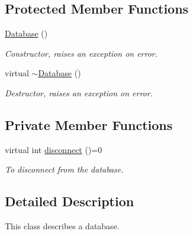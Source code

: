 \subsection*{Protected Member Functions}
\begin{DoxyCompactItemize}
\item 
\hypertarget{classDatabase_a4703c80e6969d33565ea340f768fdadf}{
\hyperlink{classDatabase_a4703c80e6969d33565ea340f768fdadf}{Database} ()}
\label{classDatabase_a4703c80e6969d33565ea340f768fdadf}

\begin{DoxyCompactList}\small\item\em Constructor, raises an exception on error. \item\end{DoxyCompactList}\item 
\hypertarget{classDatabase_a84d399a2ad58d69daab9b05330e1316d}{
virtual \hyperlink{classDatabase_a84d399a2ad58d69daab9b05330e1316d}{$\sim$Database} ()}
\label{classDatabase_a84d399a2ad58d69daab9b05330e1316d}

\begin{DoxyCompactList}\small\item\em Destructor, raises an exception on error. \item\end{DoxyCompactList}\end{DoxyCompactItemize}
\subsection*{Private Member Functions}
\begin{DoxyCompactItemize}
\item 
virtual int \hyperlink{classDatabase_adca650f8a5db531ff1fb85aaef25e711}{disconnect} ()=0
\begin{DoxyCompactList}\small\item\em To disconnect from the database. \item\end{DoxyCompactList}\end{DoxyCompactItemize}


\subsection{Detailed Description}
This class describes a database. 

